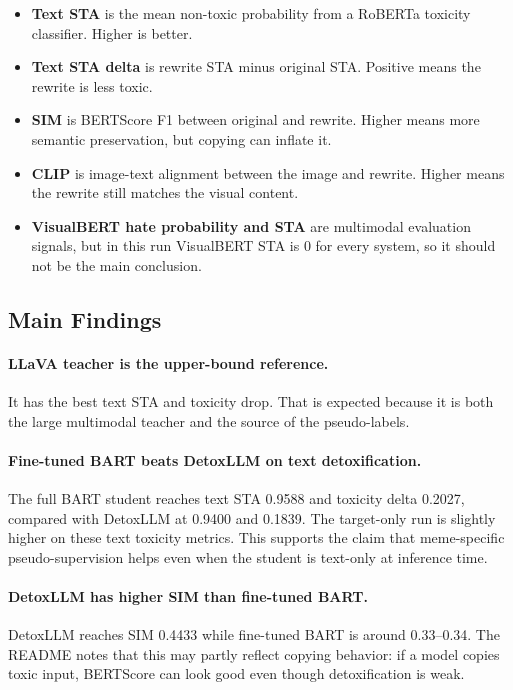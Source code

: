 \documentclass[11pt,a4paper]{article}
\begin{document}
\begin{itemize}
  \item \textbf{Text STA} is the mean non-toxic probability from a RoBERTa toxicity classifier. Higher is better.
  \item \textbf{Text STA delta} is rewrite STA minus original STA. Positive means the rewrite is less toxic.
  \item \textbf{SIM} is BERTScore F1 between original and rewrite. Higher means more semantic preservation, but copying can inflate it.
  \item \textbf{CLIP} is image-text alignment between the image and rewrite. Higher means the rewrite still matches the visual content.
  \item \textbf{VisualBERT hate probability and STA} are multimodal evaluation signals, but in this run VisualBERT STA is 0 for every system, so it should not be the main conclusion.
\end{itemize}

\subsection{Main Findings}

\paragraph{LLaVA teacher is the upper-bound reference.}
It has the best text STA and toxicity drop. That is expected because it is both the large multimodal teacher and the source of the pseudo-labels.

\paragraph{Fine-tuned BART beats DetoxLLM on text detoxification.}
The full BART student reaches text STA 0.9588 and toxicity delta 0.2027, compared with DetoxLLM at 0.9400 and 0.1839. The target-only run is slightly higher on these text toxicity metrics. This supports the claim that meme-specific pseudo-supervision helps even when the student is text-only at inference time.

\paragraph{DetoxLLM has higher SIM than fine-tuned BART.}
DetoxLLM reaches SIM 0.4433 while fine-tuned BART is around 0.33--0.34. The README notes that this may partly reflect copying behavior: if a model copies toxic input, BERTScore can look good even though detoxification is weak.
\end{document}
